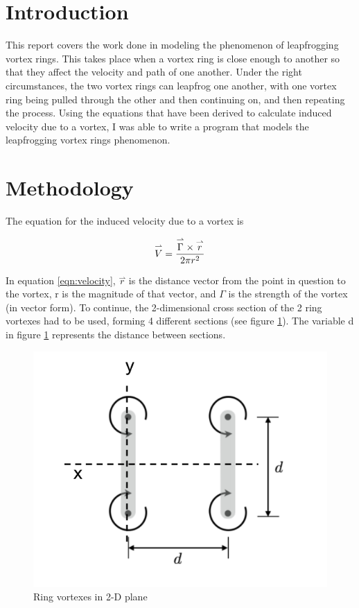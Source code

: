 \documentclass{article}
\newcommand{\vect}{\overset{\rightharpoonup}}
\begin{document}
\section{Introduction}
This report covers the work done in modeling the phenomenon of leapfrogging vortex rings. This takes place when a vortex ring is close enough to another so that they affect the velocity and path of one another. Under the right circumstances, the two vortex rings can leapfrog one another, with one vortex ring being pulled through the other and then continuing on, and then repeating the process. Using the equations that have been derived to calculate induced velocity due to a vortex, I was able to write a program that models the leapfrogging vortex rings phenomenon.

\section{Methodology}
The equation for the induced velocity due to a vortex is

\begin{equation}
    \centering
    \label{eqn:velocity}
    \vect{V} = \frac{\vect{\Gamma}\times\vect{r}}{2\pi r^2}
\end{equation}

In equation \ref{eqn:velocity}, $\vect{r}$ is the distance vector from the point in question to the vortex, r is the magnitude of that vector, and \(\Gamma\) is the strength of the vortex (in vector form). To continue, the 2-dimensional cross section of the 2 ring vortexes had to be used, forming 4 different sections (see figure \ref{fig:vortexes}). The variable d in figure \ref{fig:vortexes} represents the distance between sections.

\begin{figure}[h]
\centering
\includegraphics{vortexes}
\caption{Ring vortexes in 2-D plane}
\label{fig:vortexes}
\end{figure}
\end{document}
